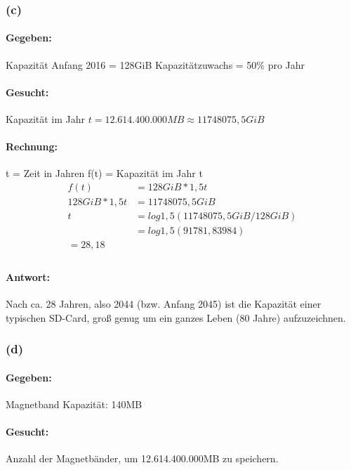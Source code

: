 \documentclass[11pt,a4paper]{article}
\begin{document}
\subsubsection{(c)} %

\paragraph{Gegeben:}
    Kapazität Anfang 2016 = 128GiB
    Kapazitätzuwachs = 50\% pro Jahr

\paragraph{Gesucht:}
    Kapazität im Jahr $t = 12.614.400.000MB \approx 11748075,5 GiB$

\paragraph{Rechnung:}
    t = Zeit in Jahren
    f(t) = Kapazität im Jahr t
\begin{align}
    f(t) &= 128GiB*1,5t\\
    128GiB*1,5t &= 11748075,5 GiB\\
    t &= log1,5(11748075,5 GiB/128GiB)\\
      &= log1,5(91781,83984)\\
       = 28,18\\
\end{align}

\paragraph{Antwort:}
    Nach ca. 28 Jahren, also 2044 (bzw. Anfang 2045) ist die Kapazität einer typischen SD-Card, groß genug um ein ganzes Leben (80 Jahre) aufzuzeichnen.


\subsubsection{(d)} %

\paragraph{Gegeben:}
    Magnetband Kapazität: 140MB

\paragraph{Gesucht:}
    Anzahl der Magnetbänder, um 12.614.400.000MB zu speichern.
\end{document}
